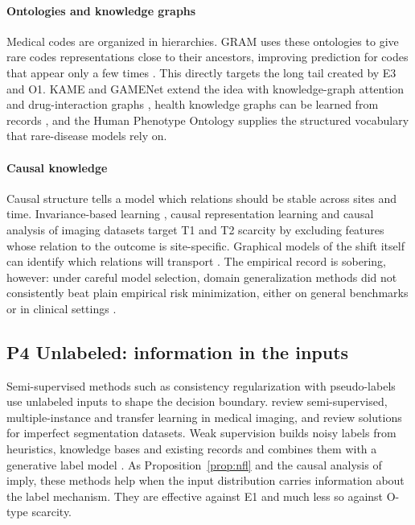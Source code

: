 \documentclass[acmsmall,screen,review]{acmart}
\theoremstyle{acmdefinition}
\begin{document}
\paragraph{Ontologies and knowledge graphs} Medical codes are organized in hierarchies. GRAM uses these ontologies to give rare codes representations close to their ancestors, improving prediction for codes that appear only a few times \cite{choi2017gram}. This directly targets the long tail created by E3 and O1. KAME and GAMENet extend the idea with knowledge-graph attention and drug-interaction graphs \cite{ma2018kame,shang2019gamenet}, health knowledge graphs can be learned from records \cite{rotmensch2017learning}, and the Human Phenotype Ontology \cite{kohler2021human} supplies the structured vocabulary that rare-disease models rely on.

\paragraph{Causal knowledge} Causal structure tells a model which relations should be stable across sites and time. Invariance-based learning \cite{arjovsky2019invariant}, causal representation learning \cite{pearl2009causality,scholkopf2021causal}
  and causal analysis of imaging datasets \cite{castro2020causality} target T1 and T2 scarcity by excluding features whose relation to the outcome is site-specific. Graphical models of the shift itself can identify which relations will transport \cite{subbaswamy2019preventing}. The empirical record is sobering, however: under careful model selection, domain generalization methods did not consistently beat plain empirical risk minimization, either on general benchmarks \cite{gulrajani2021search} or in clinical settings \cite{zhang2021empirical}.

\subsection{P4 Unlabeled: information in the inputs}\label{sec:S6_4}

 Semi-supervised methods such as consistency regularization with pseudo-labels \cite{sohn2020fixmatch} use unlabeled inputs to shape the decision boundary. \citet{cheplygina2019not} review semi-supervised, multiple-instance and transfer learning in medical imaging, and \citet{tajbakhsh2020embracing} review solutions for imperfect segmentation datasets. Weak supervision builds noisy labels from heuristics, knowledge bases and existing records and combines them with a generative label model \cite{ratner2017snorkel}. As Proposition~\ref{prop:nfl} and the causal analysis of \citet{scholkopf2012causal} imply, these methods help when the input distribution carries information about the label mechanism. They are effective against E1 and much less so against O-type scarcity.
\end{document}
